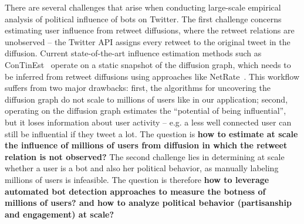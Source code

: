 There are several challenges that arise when conducting large-scale empirical analysis of political influence of bots on Twitter. 
The first challenge concerns estimating user influence from retweet diffusions, where the retweet relations are unobserved -- the Twitter API assigns every retweet to the original tweet in the diffusion.
Current state-of-the-art influence estimation methods such as ConTinEst~\cite{Du2013} operate on a static snapshot of the diffusion graph, which needs to be inferred from retweet diffusions using approaches like NetRate~\cite{Gomez-Rodriguez2011}.
This workflow suffers from two major drawbacks: 
first, the algorithms for uncovering the diffusion graph do not scale to millions of users like in our application;
second, operating on the diffusion graph estimates the ``potential of being influential'', but it loses information about user activity -- e.g. a less well connected user can still be influential if they tweet a lot.
The question is \textbf{how to estimate at scale the influence of millions of users from diffusion in which the retweet relation is not observed?}
%
%
The second challenge lies in determining at scale whether a user is a bot and also her political behavior, as manually labeling millions of users is infeasible.
The question is therefore \textbf{how to leverage automated bot detection approaches 
to measure the botness of millions of users?
and how to analyze political behavior (partisanship and engagement) at scale?}

